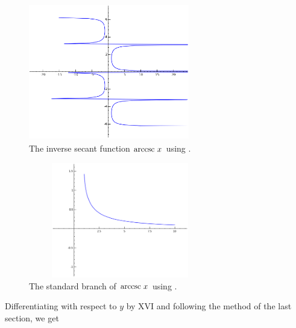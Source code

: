 \begin{figure}[h!]
\begin{minipage}{\textwidth}
\begin{center}
\includegraphics[height=6cm,width=7cm]{arccsc2.eps}
\end{center}
\end{minipage}
\caption{The inverse secant function $\arccsc\ x$ using \sage.}
\label{fig:arccsc2}
\end{figure}

\begin{figure}[h!]
\begin{minipage}{\textwidth}
\begin{center}
\includegraphics[height=5cm,width=8cm]{arccsc3.eps}
\end{center}
\end{minipage}
\caption{The standard branch of $\arccsc\ x$ using \sage.}
\label{fig:arccsc3}
\end{figure}

Differentiating with respect to $y$ by XVI and following the method of 
the last section, we get

